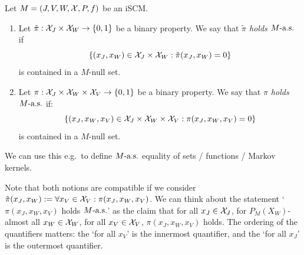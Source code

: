 \begin{Def}
  Let $M = \left ( J, V, W, \mathcal{X}, P, f \right )$ be an iSCM.
  \begin{enumerate}
    \item Let $\tilde\pi : \mathcal{X}_J \times \mathcal{X}_W \to \{0,1\}$ be a binary property.
      We say that \emph{$\tilde\pi$ holds $M\text{-a.s.}$} if
      $$\{(x_J,x_W) \in \mathcal{X}_J \times \mathcal{X}_W : \tilde\pi(x_J,x_W) = 0\}$$
      is contained in a $M$-null set.
    \item Let $\pi : \mathcal{X}_J \times \mathcal{X}_W \times \mathcal{X}_V \to \{0,1\}$ be a binary property.
      We say that \emph{$\pi$ holds $M\text{-a.s.}$} if:
      $$\{(x_J,x_W,x_V) \in \mathcal{X}_J \times \mathcal{X}_W \times \mathcal{X}_V : \pi(x_J,x_W,x_V) = 0\}$$
      is contained in a $M$-null set.
  \end{enumerate}
  We can use this e.g.\ to define $M\text{-a.s.}$ equality of sets / functions / Markov kernels.
\end{Def}
Note that both notions are compatible if we consider $\tilde{\pi}(x_J,x_W) := \forall x_V \in \mathcal{X}_V: \pi(x_J,x_W,x_V)$.
We can think about the statement `$\pi(x_J,x_W,x_V)$ holds $M\text{-a.s.}$' as the claim that
for all $x_J \in \mathcal{X}_J$, for $P_M(X_W)$-almost all $x_W \in \mathcal{X}_W$, for all $x_V \in \mathcal{X}_V$, $\pi(x_J,x_W,x_V)$ holds. 
The ordering of the quantifiers matters: the `for all $x_V$' is the innermost quantifier, and the `for all $x_J$' is the outermost quantifier.


